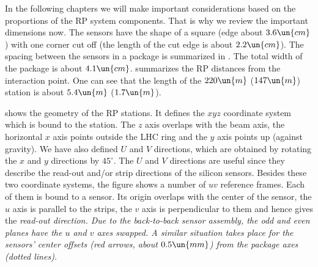 
In the following chapters we will make important considerations based on the proportions of the RP system components. That is why we review the important dimensions now. The sensors have the shape of a square (edge about $3.6\un{cm}$) with one corner cut off (the length of the cut edge is about $2.2\un{cm}$). The spacing between the sensors in a package is summarized in . The total width of the package is about $4.1\un{cm}$.  summarizes the RP distances from the interaction point. One can see that the length of the $220\un{m}$ ($147\un{m}$) station is about $5.4\un{m}$ ($1.7\un{m}$).



 shows the geometry of the RP stations. It defines the $xyz$ coordinate system which is bound to the station. The $z$ axis overlaps with the beam axis, the horizontal $x$ axis points outside the LHC ring and the $y$ axis points up (against gravity). We have also defined $U$ and $V$ directions, which are obtained by rotating the $x$ and $y$ directions by $45^\circ$. The $U$ and $V$ directions are useful since they describe the read-out and/or strip directions of the silicon sensors. Besides these two coordinate systems, the figure shows a number of $uv$ reference frames. Each of them is bound to a sensor. Its origin overlaps with the center of the sensor, the $u$ axis is parallel to the strips, the $v$ axis is perpendicular to them and hence gives the \em{read-out direction}. Due to the back-to-back sensor assembly, the odd and even planes have the $u$ and $v$ axes swapped. A similar situation takes place for the sensors' center offsets (red arrows, about $0.5\un{mm}$) from the package axes (dotted lines).

